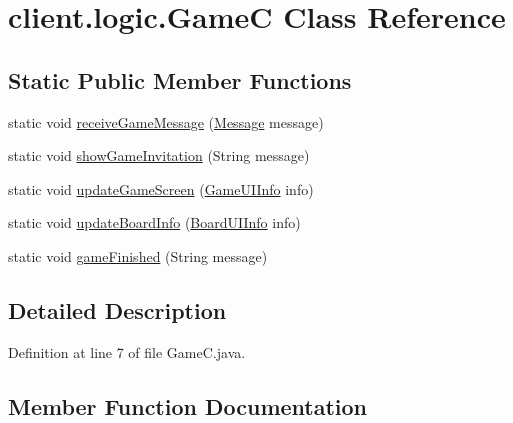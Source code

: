 \hypertarget{classclient_1_1logic_1_1_game_c}{}\section{client.\+logic.\+GameC Class Reference}
\label{classclient_1_1logic_1_1_game_c}
\subsection*{Static Public Member Functions}
\begin{DoxyCompactItemize}
\item 
static void \hyperlink{classclient_1_1logic_1_1_game_c_a70979b2783537bb175c0a8926680e236}{receive\+Game\+Message} (\hyperlink{classpt_1_1up_1_1fe_1_1lpro1613_1_1sharedlib_1_1tuples_1_1_message}{Message} message)
\item 
static void \hyperlink{classclient_1_1logic_1_1_game_c_a62c530e593e489903a8ab6557763be27}{show\+Game\+Invitation} (String message)
\item 
static void \hyperlink{classclient_1_1logic_1_1_game_c_a5efa8858529daa61b2c4639b9a7c2949}{update\+Game\+Screen} (\hyperlink{classpt_1_1up_1_1fe_1_1lpro1613_1_1sharedlib_1_1tuples_1_1_game_u_i_info}{Game\+U\+I\+Info} info)
\item 
static void \hyperlink{classclient_1_1logic_1_1_game_c_a055e1c7cadc523d1c851af8856b0214d}{update\+Board\+Info} (\hyperlink{classpt_1_1up_1_1fe_1_1lpro1613_1_1sharedlib_1_1tuples_1_1_board_u_i_info}{Board\+U\+I\+Info} info)
\item 
static void \hyperlink{classclient_1_1logic_1_1_game_c_afee9b1e47ab82d704759506c4cb5e2ad}{game\+Finished} (String message)
\end{DoxyCompactItemize}


\subsection{Detailed Description}


Definition at line 7 of file Game\+C.\+java.



\subsection{Member Function Documentation}
\hypertarget{classclient_1_1logic_1_1_game_c_afee9b1e47ab82d704759506c4cb5e2ad}{}\label{classclient_1_1logic_1_1_game_c_afee9b1e47ab82d704759506c4cb5e2ad} 
